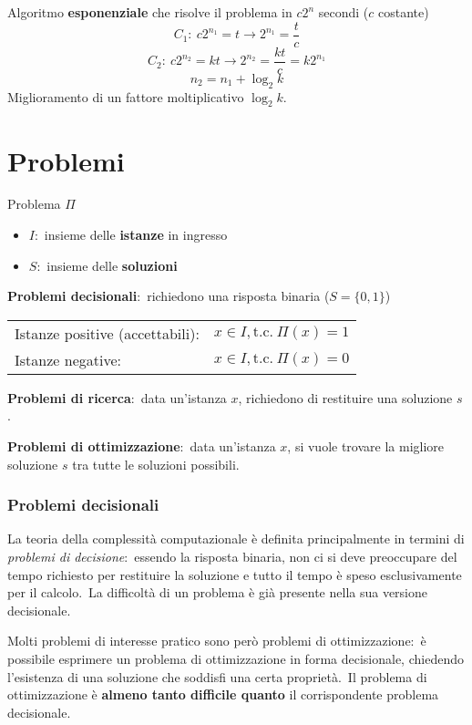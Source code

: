 Algoritmo \textbf{esponenziale} che risolve il problema in $c 2^n$ secondi ($c$ costante)
\[C_1:\ c2^{n_1} = t \rightarrow 2^{n_1} = \frac{t}{c}\]
\[C_2:\ c2^{n_2} = kt \rightarrow 2^{n_2} = \frac{kt}{c} = k2^{n_1}\]
\[n_2 = n_1 + \log_2k\]
Miglioramento di un fattore moltiplicativo $\log_2k$.\

\section{Problemi}

Problema $\Pi$
\begin{itemize}
    \item $I$:\ insieme delle \textbf{istanze} in ingresso
    \item $S$:\ insieme delle \textbf{soluzioni}
\end{itemize}

\noindent \textbf{Problemi decisionali}:\ richiedono una risposta binaria ($S = \{0,1\}$)
\begin{table}[H]
    \centering
    \begin{tabular}{l l}
        Istanze positive (accettabili): & $x \in I, \mathrm{t.c.}\ \Pi(x) = 1$ \\
        Istanze negative:               & $x \in I, \mathrm{t.c.}\ \Pi(x) = 0$ \\
    \end{tabular}
\end{table}
\noindent \textbf{Problemi di ricerca}:\ data un'istanza $x$, richiedono di restituire una soluzione $s$.\

\noindent\textbf{Problemi di ottimizzazione}:\ data un'istanza $x$, si vuole trovare la migliore soluzione $s$ tra tutte le soluzioni possibili.\

\subsubsection{Problemi decisionali}

La teoria della complessità computazionale è definita principalmente in termini di \textit{problemi di decisione}:\ essendo la risposta binaria, non ci si deve preoccupare del tempo richiesto per restituire la soluzione e tutto il tempo è speso esclusivamente per il calcolo.\
La difficoltà di un problema è già presente nella sua versione decisionale.\

Molti problemi di interesse pratico sono però problemi di ottimizzazione:\ è possibile esprimere un problema di ottimizzazione in forma decisionale, chiedendo l'esistenza di una soluzione che soddisfi una certa proprietà.\
Il problema di ottimizzazione è \textbf{almeno tanto difficile quanto} il corrispondente problema decisionale.\

